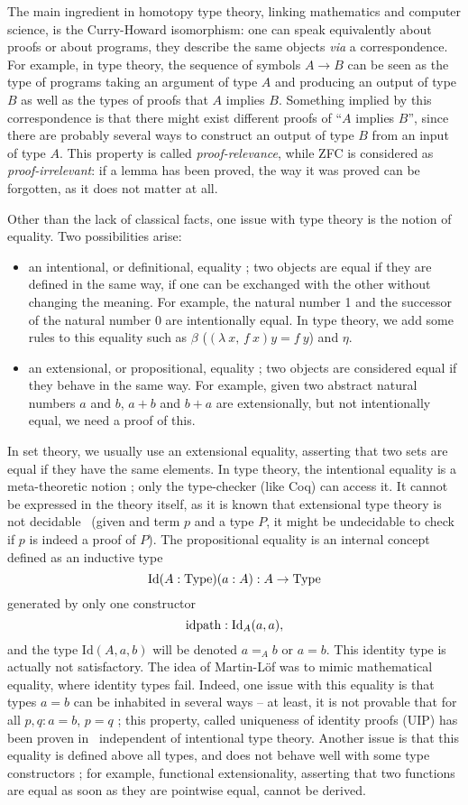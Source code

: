 The main ingredient in homotopy type theory, linking mathematics and
computer science, is the Curry-Howard isomorphism: one can speak
equivalently about proofs or about programs, they describe the same
objects {\em via} a correspondence. For example, in type theory, the
sequence of symbols $A\to B$ can be seen as the type of programs
taking an argument of type $A$ and producing an output of type $B$ as
well as the types of proofs that $A$ implies $B$. Something implied by
this correspondence is that there might exist different proofs of
``$A$ implies $B$'', since there are probably several ways to
construct an output of type $B$ from an input of type $A$. This
property is called {\em proof-relevance}, while ZFC is considered as
{\em proof-irrelevant}: if a lemma has been proved, the way it was
proved can be forgotten, as it does not matter at all.

Other than the lack of classical facts, one issue with type theory is
the notion of equality. Two possibilities arise:
\begin{itemize}
\item an intentional, or definitional, equality ; two objects are
equal if they are defined in the same way, \ie{} if one can be
exchanged with the other without changing the meaning. For example,
the natural number 1 and the successor of the natural number 0 are
intentionally equal. In type theory, we add some rules to this
equality such as $\beta$ ($(\lambda\ x,\,f\ x)y = f\ y$) and $\eta$.
\item an extensional, or propositional, equality ; two objects are
considered equal if they behave in the same way. For example, given
two abstract natural numbers $a$ and $b$, $a+b$ and $b+a$ are
extensionally, but not intentionally equal, \ie{} we need a proof of
this.
\end{itemize} In set theory, we usually use an extensional equality,
asserting that two sets are equal if they have the same elements. In
type theory, the intentional equality is a meta-theoretic notion ;
only the type-checker (like Coq) can access it. It cannot be expressed
in the theory itself, as it is known that extensional type theory is
not decidable~\cite{hofmann1995extensional} (given and term $p$ and a
type $P$, it might be undecidable to check if $p$ is indeed a proof of
$P$). The propositional equality is an internal concept defined as an
inductive type
\[ \mathrm{Id} (A:\operatorname{Type}) (a:A) : A \to \operatorname{Type}
\] generated by only one constructor
\[ \mathrm{idpath} : \mathrm{Id}_A(a,a),
\] and the type $\mathrm{Id}(A,a,b)$ will be denoted $a=_Ab$ or $a=b$.
This identity type is actually not satisfactory. The idea of
Martin-Löf was to mimic mathematical equality, where identity types
fail. Indeed, one issue with this equality is that types $a=b$ can be
inhabited in several ways -- at least, it is not provable that for all
$p,q:a=b$, $p=q$ ; this property, called uniqueness of identity proofs
(UIP) has been proven in~\cite{Hofmann96thegroupoid} independent of
intentional type theory.  Another issue is that this equality is
defined above all types, and does not behave well with some type
constructors ; for example, functional extensionality, asserting that
two functions are equal as soon as they are pointwise equal, cannot be
derived.

